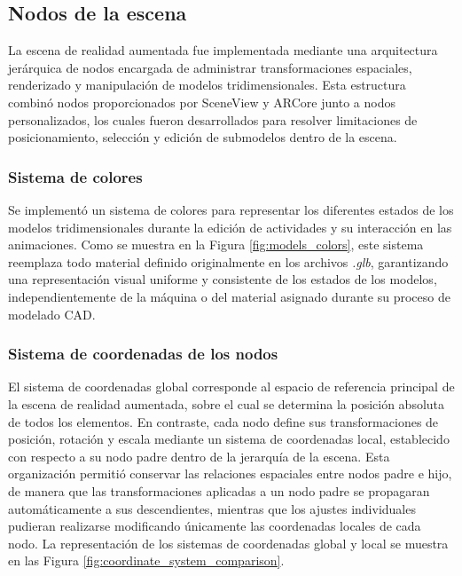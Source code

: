             

    \subsection{Nodos de la escena}

        La escena de realidad aumentada fue implementada mediante una arquitectura jerárquica de nodos encargada de administrar transformaciones espaciales, renderizado y manipulación de modelos tridimensionales. Esta estructura combinó nodos proporcionados por SceneView y ARCore junto a nodos personalizados, los cuales fueron desarrollados para resolver limitaciones de posicionamiento, selección y edición de submodelos dentro de la escena.

        \subsubsection{Sistema de colores}

            Se implementó un sistema de colores para representar los diferentes estados de los modelos tridimensionales durante la edición de actividades y su interacción en las animaciones. Como se muestra en la Figura \ref{fig:models_colors}, este sistema reemplaza todo material definido originalmente en los archivos \textit{.glb}, garantizando una representación visual uniforme y consistente de los estados de los modelos, independientemente de la máquina o del material asignado durante su proceso de modelado CAD.

            

        \subsubsection{Sistema de coordenadas de los nodos}

            El sistema de coordenadas global corresponde al espacio de referencia principal de la escena de realidad aumentada, sobre el cual se determina la posición absoluta de todos los elementos. En contraste, cada nodo define sus transformaciones de posición, rotación y escala mediante un sistema de coordenadas local, establecido con respecto a su nodo padre dentro de la jerarquía de la escena. Esta organización permitió conservar las relaciones espaciales entre nodos padre e hijo, de manera que las transformaciones aplicadas a un nodo padre se propagaran automáticamente a sus descendientes, mientras que los ajustes individuales pudieran realizarse modificando únicamente las coordenadas locales de cada nodo. La representación de los sistemas de coordenadas global y local se muestra en las Figura \ref{fig:coordinate_system_comparison}.

